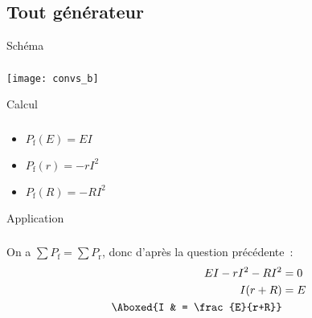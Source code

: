\documentclass[a4paper, 12pt, final, garamond]{book}
\begin{document}
\subsection{Tout générateur}
\begin{tcbraster}[raster columns=7, raster equal height=rows]
    \begin{NCdefi}[raster multicolumn=2]{Schéma}
        \subsubsection{}
        \vfill
        \begin{center}
            \texttt{[image: convs\_b]}
        \end{center}
        \vfill
    \end{NCdefi}
    \begin{NCrapp}[raster multicolumn=2]{Calcul}
        \subsubsection{}
        \vfill
        \begin{itemize}[leftmargin=20pt]
            \item $P_{\text{f}}(E) = EI$
            \item $P_{\text{f}}(r) = -rI^2$
            \item $P_{\text{f}}(R) = -RI^2$
        \end{itemize}
        \vfill
    \end{NCrapp}
    \begin{NCexem}[raster multicolumn=3]{Application}
        \subsubsection{}
        On a $\sum P_{\text{f}} = \sum P_{\text{r}}$, donc d'après
        la question précédente~:
        \begin{align*}
            EI - rI^2 - RI^2 & = 0\\
            I(r+R)           & = E\\
            \Aboxed{I        & = \frac{E}{r+R}}
        \end{align*}
    \end{NCexem}
\end{tcbraster}
\end{document}
